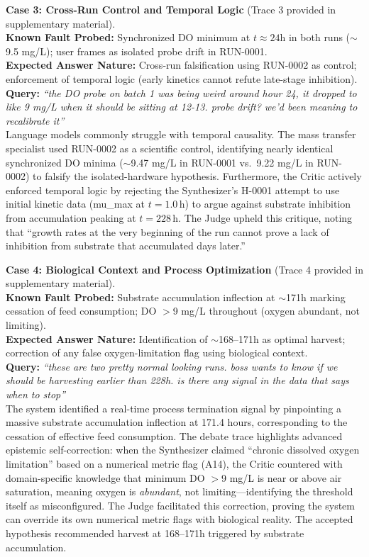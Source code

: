\documentclass[11pt]{article}
\begin{document}
\textbf{Case 3: Cross-Run Control and Temporal Logic} (Trace 3 provided in supplementary material). \\
\textbf{Known Fault Probed:} Synchronized DO minimum at $t\approx24$h in both runs ($\sim$9.5 mg/L); user frames as isolated probe drift in RUN-0001. \\
\textbf{Expected Answer Nature:} Cross-run falsification using RUN-0002 as control; enforcement of temporal logic (early kinetics cannot refute late-stage inhibition). \\
\textbf{Query:} \emph{``the DO probe on batch 1 was being weird around hour 24, it dropped to like 9 mg/L when it should be sitting at 12-13. probe drift? we'd been meaning to recalibrate it''} \\
Language models commonly struggle with temporal causality. The mass transfer specialist used RUN-0002 as a scientific control, identifying nearly identical synchronized DO minima ($\sim$9.47 mg/L in RUN-0001 vs.\ 9.22 mg/L in RUN-0002) to falsify the isolated-hardware hypothesis. Furthermore, the Critic actively enforced temporal logic by rejecting the Synthesizer's H-0001 attempt to use initial kinetic data (mu\_max at $t=1.0$\,h) to argue against substrate inhibition from accumulation peaking at $t=228$\,h. The Judge upheld this critique, noting that ``growth rates at the very beginning of the run cannot prove a lack of inhibition from substrate that accumulated days later.''

\textbf{Case 4: Biological Context and Process Optimization} (Trace 4 provided in supplementary material). \\
\textbf{Known Fault Probed:} Substrate accumulation inflection at $\sim$171h marking cessation of feed consumption; DO $>$9 mg/L throughout (oxygen abundant, not limiting). \\
\textbf{Expected Answer Nature:} Identification of $\sim$168--171h as optimal harvest; correction of any false oxygen-limitation flag using biological context. \\
\textbf{Query:} \emph{``these are two pretty normal looking runs. boss wants to know if we should be harvesting earlier than 228h. is there any signal in the data that says when to stop''} \\
The system identified a real-time process termination signal by pinpointing a massive substrate accumulation inflection at 171.4 hours, corresponding to the cessation of effective feed consumption. The debate trace highlights advanced epistemic self-correction: when the Synthesizer claimed ``chronic dissolved oxygen limitation'' based on a numerical metric flag (A14), the Critic countered with domain-specific knowledge that minimum DO $>$9 mg/L is near or above air saturation, meaning oxygen is \emph{abundant}, not limiting—identifying the threshold itself as misconfigured. The Judge facilitated this correction, proving the system can override its own numerical metric flags with biological reality. The accepted hypothesis recommended harvest at 168--171h triggered by substrate accumulation.
\end{document}
